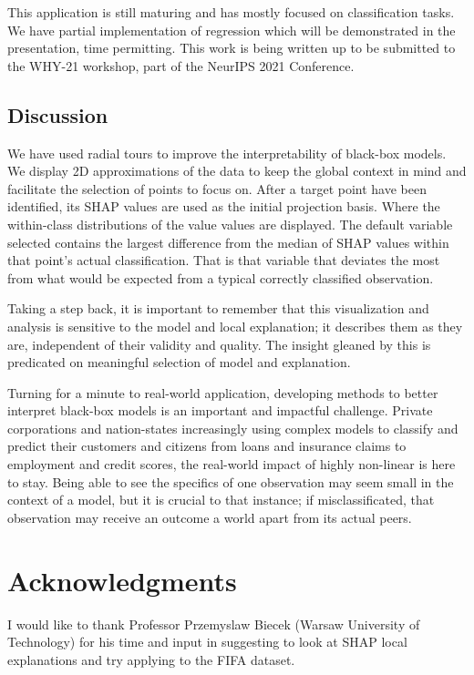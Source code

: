 \documentclass{template/monashthesis}
\begin{document}
This application is still maturing and has mostly focused on classification tasks. We have partial implementation of regression which will be demonstrated in the presentation, time permitting. This work is being written up to be submitted to the WHY-21 workshop, part of the NeurIPS 2021 Conference.

\hypertarget{discussion}{%
\subsection{Discussion}\label{discussion}}

We have used radial tours to improve the interpretability of black-box models. We display 2D approximations of the data to keep the global context in mind and facilitate the selection of points to focus on. After a target point have been identified, its SHAP values are used as the initial projection basis. Where the within-class distributions of the value values are displayed. The default variable selected contains the largest difference from the median of SHAP values within that point's actual classification. That is that variable that deviates the most from what would be expected from a typical correctly classified observation.

Taking a step back, it is important to remember that this visualization and analysis is sensitive to the model and local explanation; it describes them as they are, independent of their validity and quality. The insight gleaned by this is predicated on meaningful selection of model and explanation.

Turning for a minute to real-world application, developing methods to better interpret black-box models is an important and impactful challenge. Private corporations and nation-states increasingly using complex models to classify and predict their customers and citizens from loans and insurance claims to employment and credit scores, the real-world impact of highly non-linear is here to stay. Being able to see the specifics of one observation may seem small in the context of a model, but it is crucial to that instance; if misclassificated, that observation may receive an outcome a world apart from its actual peers.

\hypertarget{sec:acknowledgments}{%
\section{Acknowledgments}\label{sec:acknowledgments}}

I would like to thank Professor Przemyslaw Biecek (Warsaw University of Technology) for his time and input in suggesting to look at SHAP local explanations and try applying to the FIFA dataset.
\end{document}
